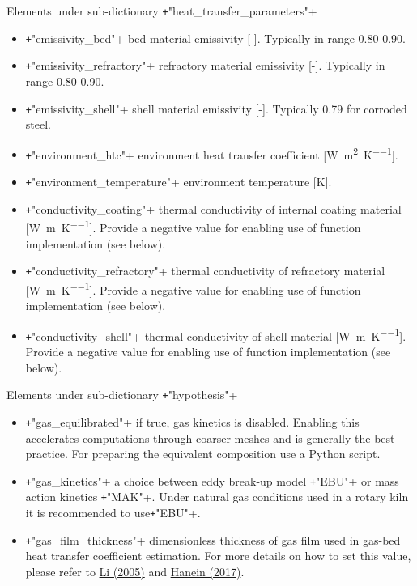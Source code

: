 \documentclass[11pt]{paper}
\begin{document}
\noindent{}Elements under sub-dictionary \texttt+"heat_transfer_parameters"+

\begin{itemize}
	\item \texttt+"emissivity_bed"+
	bed material emissivity [-]. Typically in range 0.80-0.90.
	
	\item \texttt+"emissivity_refractory"+
	refractory material emissivity [-]. Typically in range 0.80-0.90.
	
	\item \texttt+"emissivity_shell"+
	shell material emissivity [-]. Typically 0.79 for corroded steel.
	
	\item \texttt+"environment_htc"+
	environment heat transfer coefficient [\si{\watt\per\square\meter\per\kelvin}].
	
	\item \texttt+"environment_temperature"+
	environment temperature [\si{\kelvin}].
	
	\item \texttt+"conductivity_coating"+
	thermal conductivity of internal coating material [\si{\watt\per\meter\per\kelvin}]. Provide a negative value for enabling use of function implementation (see below).
	
	\item \texttt+"conductivity_refractory"+
	thermal conductivity of refractory material [\si{\watt\per\meter\per\kelvin}]. Provide a negative value for enabling use of function implementation (see below).
	
	\item \texttt+"conductivity_shell"+
	thermal conductivity of shell material [\si{\watt\per\meter\per\kelvin}]. Provide a negative value for enabling use of function implementation (see below).
\end{itemize}

\noindent{}Elements under sub-dictionary \texttt+"hypothesis"+

\begin{itemize}
	\item \texttt+"gas_equilibrated"+
	if true, gas kinetics is disabled. Enabling this accelerates computations through coarser meshes and is generally the best practice. For preparing the equivalent composition use a Python script.
	
	\item \texttt+"gas_kinetics"+
	a choice between eddy break-up model \texttt+"EBU"+ or mass action kinetics \texttt+"MAK"+. Under natural gas conditions used in a rotary kiln it is recommended to use\texttt+"EBU"+.
	
	\item \texttt+"gas_film_thickness"+
	dimensionless thickness of gas film used in gas-bed heat transfer coefficient estimation. For more details on how to set this value, please refer to \href{https://doi.org/10.1002/ceat.200500241}{Li (2005)} and \href{https://doi.org/10.1080/17436753.2017.1303261}{Hanein (2017)}.
\end{itemize}
\end{document}
